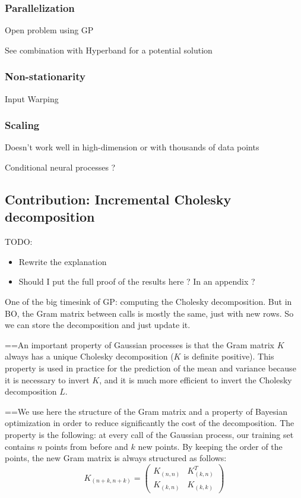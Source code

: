 \subsubsection{Parallelization}

Open problem using GP

See combination with Hyperband for a potential solution

\subsubsection{Non-stationarity}
\label{ssec:nosta}

Input Warping~\textcite{snoek2014ICML}

\subsubsection{Scaling}

Doesn't work well in high-dimension or with thousands of data points

Conditional neural processes ?

\subsection{Contribution: Incremental Cholesky decomposition}

TODO:
\begin{itemize}
    \item Rewrite the explanation
    \item Should I put the full proof of the results here ? In an appendix ?  
\end{itemize}

One of the big timesink of GP: computing the Cholesky decomposition. But in BO, the Gram matrix between calls is mostly the same, just with new rows. So we can store the decomposition and just update it.

==An important property of Gaussian processes is that the Gram matrix $K$ always has a unique Cholesky decomposition ($K$ is definite positive). This property is used in practice for the prediction of the mean and variance because it is necessary to invert $K$, and it is much more efficient to invert the Cholesky decomposition $L$.

==We use here the structure of the Gram matrix and a property of Bayesian optimization in order to reduce significantly the cost of the decomposition. The property is the following: at every call of the Gaussian process, our training set contains $n$ points from before and $k$ new points. By keeping the order of the points, the new Gram matrix is always structured as follows:
\begin{equation}
	K_{(n+k,n+k)} = 
    \begin{pmatrix}
    K_{(n,n)} & K_{(k,n)}^T \\
    K_{(k,n)} & K_{(k,k)}
  \end{pmatrix}
\end{equation}

